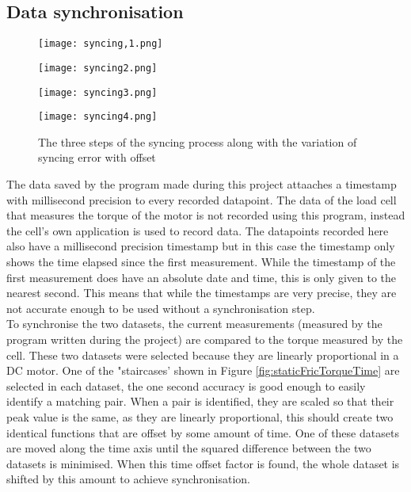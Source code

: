 \documentclass[12pt]{article}
\begin{document}
\subsection{Data synchronisation}

\begin{figure}[h]

    \begin{minipage}{0.49\textwidth}
        \centering
        \texttt{[image: syncing,1.png]}
        
    \end{minipage}
    \begin{minipage}{0.49\textwidth}
        \centering
        \texttt{[image: syncing2.png]}
        
    \end{minipage}

    \begin{minipage}{0.49\textwidth}
        \centering
        \texttt{[image: syncing3.png]}
        
    \end{minipage}
    \begin{minipage}{0.49\textwidth}
        \centering
        \texttt{[image: syncing4.png]}
        
    \end{minipage}
    \caption{The three steps of the syncing process along with the variation of syncing error with offset}
    \label{fig:syncing}
\end{figure}



The data saved by the program made during this project attaaches a timestamp with millisecond precision to every recorded datapoint. The data of the load cell that measures the torque of the motor is not recorded using this program, instead the cell's own application is used to record data. The datapoints recorded here also have a millisecond precision timestamp but in this case the timestamp only shows the time elapsed since the first measurement. While the timestamp of the first measurement does have an absolute date and time, this is only given to the nearest second. This means that while the timestamps are very precise, they are not accurate enough to be used without a synchronisation step.\\

To synchronise the two datasets, the current measurements (measured by the program written during the project) are compared to the torque measured by the cell. These two datasets were selected because they are linearly proportional in a DC motor. One of the "staircases' shown in Figure \ref{fig:staticFricTorqueTime} are selected in each dataset, the one second accuracy is good enough to easily identify a matching pair. When a pair is identified, they are scaled so that their peak value is the same, as they are linearly proportional, this should create two identical functions that are offset by some amount of time. One of these datasets are moved along the time axis until the squared difference between the two datasets is minimised. When this time offset factor is found, the whole dataset is shifted by this amount to achieve synchronisation.
\end{document}

